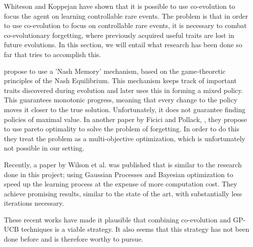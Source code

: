 

Whiteson and Koppejan have shown that it is possible to use co-evolution to focus the agent on learning controllable rare events. The problem is that in order to use co-evolution to focus on controllable rare events, it is necessary to combat co-evolutionary forgetting, where previously acquired useful traits are lost in future evolutions. In this section, we will entail what research has been done so far that tries to accomplish this.

\cite{ficici2003game} propose to use a 'Nash Memory' mechanism, based on the game-theoretic principles of the Nash Equilibrium. This mechanism keeps track of important traits discovered during evolution and later uses this in forming a mixed policy. This guarantees monotonic progress, meaning that every change to the policy moves it closer to the true solution. Unfortunately, it does not guarantee finding policies of maximal value. In another paper by Ficici and Pollack, \cite{ficici2001pareto}, they propose to use pareto optimality to solve the problem of forgetting. In order to do this they treat the problem as a multi-objective optimization, which is unfortunately not possible in our setting.

Recently, a paper by Wilson et al. \cite{wilson2014using} was published that is similar to the research done in this project; using Gaussian Processes and Bayesian optimization to speed up the learning process at the expense of more computation cost. They achieve promising results, similar to the state of the art, with substantially less iterations necessary.

These recent works have made it plausible that combining co-evolution and GP-UCB techniques is a viable strategy. It also seems that this strategy has not been done before and is therefore worthy to pursue.